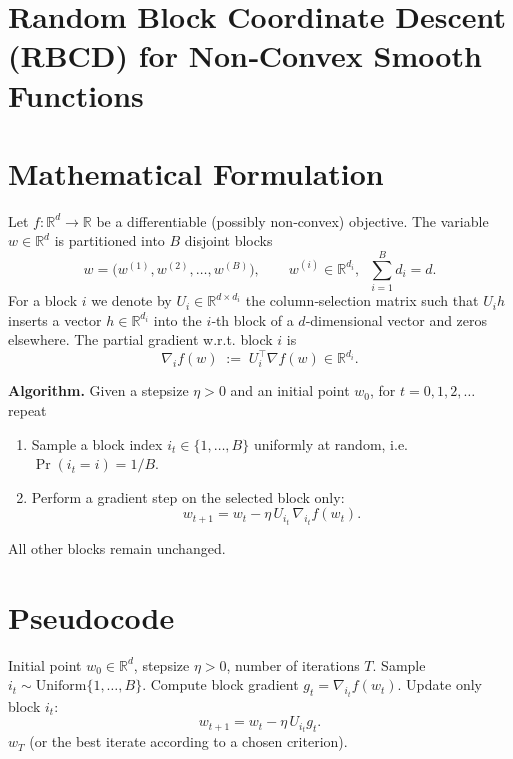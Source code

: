 \documentclass{article}
\begin{document}
\section*{Random Block Coordinate Descent (RBCD) for Non‑Convex Smooth Functions}

\section*{Mathematical Formulation}
Let $f:\mathbb{R}^{d}\rightarrow\mathbb{R}$ be a differentiable (possibly non‑convex) objective.  
The variable $w\in\mathbb{R}^{d}$ is partitioned into $B$ disjoint blocks
\[
w = \bigl(w^{(1)},w^{(2)},\dots ,w^{(B)}\bigr),\qquad 
w^{(i)}\in\mathbb{R}^{d_i},\;\;\sum_{i=1}^{B}d_i=d .
\]
For a block $i$ we denote by $U_i\in\mathbb{R}^{d\times d_i}$ the column‑selection matrix such that
$U_i h$ inserts a vector $h\in\mathbb{R}^{d_i}$ into the $i$‑th block of a $d$‑dimensional vector and zeros elsewhere.
The partial gradient w.r.t. block $i$ is
\[
\nabla_i f(w) \;:=\; U_i^{\top}\nabla f(w)\in\mathbb{R}^{d_i}.
\]

\bigskip
\noindent\textbf{Algorithm.}  
Given a stepsize $\eta>0$ and an initial point $w_0$, for $t=0,1,2,\dots$ repeat

\begin{enumerate}
\item Sample a block index $i_t\in\{1,\dots ,B\}$ uniformly at random,
      i.e. $\Pr(i_t=i)=1/B$.
\item Perform a gradient step on the selected block only:
\[
w_{t+1}= w_t - \eta\,U_{i_t}\,\nabla_{i_t} f(w_t).
\tag{1}
\]
\end{enumerate}
All other blocks remain unchanged.

\section*{Pseudocode}
\begin{algorithm}[H]
\caption{Random Block Coordinate Descent (RBCD)}
\begin{algorithmic}[1]
\REQUIRE Initial point $w_0\in\mathbb{R}^d$, stepsize $\eta>0$, number of iterations $T$.
    \STATE Sample $i_t\sim\text{Uniform}\{1,\dots ,B\}$.
    \STATE Compute block gradient $g_t=\nabla_{i_t}f(w_t)$.
    \STATE Update only block $i_t$:
    \[
    w_{t+1}=w_t-\eta\,U_{i_t}g_t .
    \]
\ENDFOR
\RETURN $w_T$ (or the best iterate according to a chosen criterion).
\end{algorithmic}
\end{algorithm}
\end{document}
